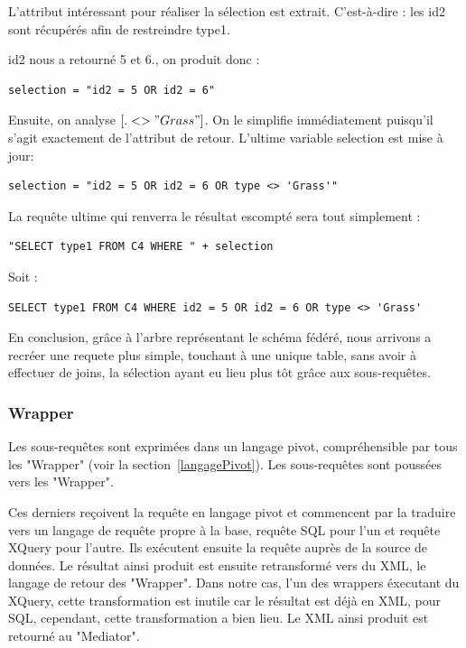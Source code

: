 L'attribut intéressant pour réaliser la sélection est extrait. C'est-à-dire : les id2 sont récupérés afin de restreindre type1.

id2 nous a retourné 5 et 6., on produit donc :
\begin{lstlisting}
selection = "id2 = 5 OR id2 = 6"
\end{lstlisting}

Ensuite, on analyse $[. <> "Grass"]$. On le simplifie immédiatement puisqu'il s'agit exactement de l'attribut de retour. L'ultime variable selection est mise à jour:
\begin{lstlisting}
selection = "id2 = 5 OR id2 = 6 OR type <> 'Grass'"
\end{lstlisting}

La requête ultime qui renverra le résultat escompté sera tout simplement :

\begin{lstlisting}
"SELECT type1 FROM C4 WHERE " + selection
\end{lstlisting}

Soit :

\begin{lstlisting}
SELECT type1 FROM C4 WHERE id2 = 5 OR id2 = 6 OR type <> 'Grass'
\end{lstlisting}
En conclusion, grâce à l'arbre représentant le schéma fédéré, nous arrivons a recréer une requete plus simple, touchant à une unique table,  sans avoir à effectuer de joins, la sélection ayant eu lieu plus tôt grâce aux sous-requêtes.

\subsubsection{Wrapper}

Les sous-requêtes sont exprimées dans un langage pivot, compréhensible par tous les "Wrapper" (voir la section~\ref{langagePivot}). Les sous-requêtes sont poussées vers les "Wrapper".

Ces derniers reçoivent la requête en langage pivot et commencent par la traduire vers un langage de requête propre à la base, requête SQL pour l'un et requête XQuery pour l'autre. Ils exécutent ensuite la requête auprès de la source de données. Le résultat ainsi produit est ensuite retransformé vers du XML, le langage de retour des "Wrapper". Dans notre cas, l'un des wrappers éxecutant du XQuery, cette transformation est inutile car le résultat est déjà en XML, pour SQL, cependant, cette transformation a bien lieu. Le XML ainsi produit est retourné au "Mediator".

